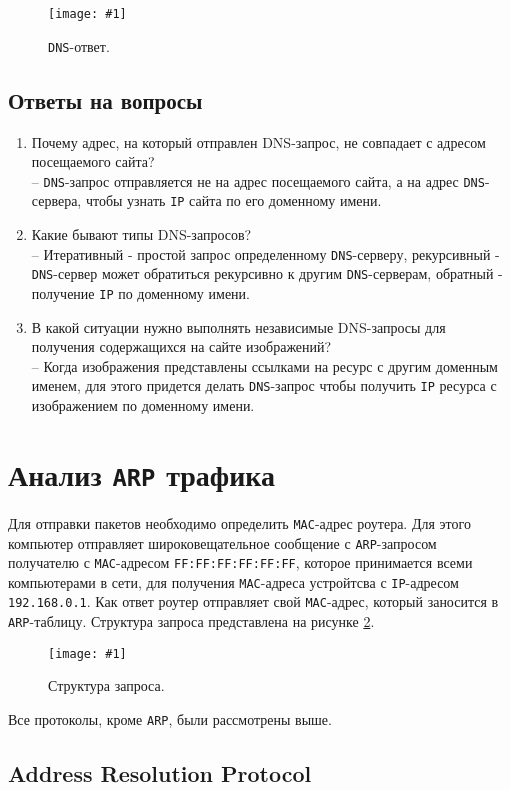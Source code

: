 \documentclass[12pt, a4paper]{article}
\newcommand{\figc}[4]{
  \begin{figure}[H]
  \begin{center}
    \texttt{[image: \#1]}
    \caption{#2}
    \label{fig:#3}
  \end{center}
  \end{figure}
}
\begin{document}
\figc{dns_res}{\texttt{DNS}-ответ.}{d_rs}{2.5}

\subsection{Ответы на вопросы}

\begin{enumerate}
  \item Почему адрес, на который отправлен DNS-запрос, не совпадает с адресом
    посещаемого сайта?\\
    -- \texttt{DNS}-запрос отправляется не на адрес посещаемого сайта, а на
    адрес \texttt{DNS}-сервера, чтобы узнать \texttt{IP} сайта по его доменному
    имени.
  \item Какие бывают типы DNS-запросов?\\
    -- Итеративный - простой запрос определенному \texttt{DNS}-серверу, рекурсивный -
    \texttt{DNS}-сервер может обратиться рекурсивно к другим \texttt{DNS}-серверам,
    обратный - получение \texttt{IP} по доменному имени.
  \item В какой ситуации нужно выполнять независимые DNS-запросы для получения
    содержащихся на сайте изображений?\\
    -- Когда изображения представлены ссылками на ресурс с другим доменным
    именем, для этого придется делать \texttt{DNS}-запрос чтобы получить \texttt{IP}
    ресурса с изображением по доменному имени.
\end{enumerate}

\section{Анализ \texttt{ARP} трафика}

Для отправки пакетов необходимо определить \texttt{MAC}-адрес роутера. Для этого
компьютер отправляет широковещательное сообщение с \texttt{ARP}-запросом
получателю с \texttt{MAC}-адресом \texttt{FF:FF:FF:FF:FF:FF}, которое принимается
всеми компьютерами в сети, для получения \texttt{MAC}-адреса устройтсва с
\texttt{IP}-адресом \texttt{192.168.0.1}. Как ответ роутер отправляет свой
\texttt{MAC}-адрес, который заносится в \texttt{ARP}-таблицу. Структура запроса
представлена на рисунке \ref{fig:a_h}.

\figc{arp_headers}{Структура запроса.}{a_h}{2.5}

Все протоколы, кроме \texttt{ARP}, были рассмотрены выше.

\subsection{Address Resolution Protocol}
\end{document}
